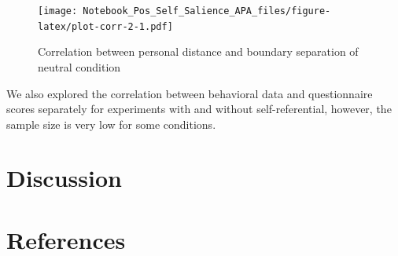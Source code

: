 \documentclass[
  english,
  man]{apa6}
\begin{document}
\begin{figure}
\centering
\texttt{[image: Notebook\_Pos\_Self\_Salience\_APA\_files/figure-latex/plot-corr-2-1.pdf]}
\caption{\label{fig:plot-corr-2}Correlation between personal distance and boundary separation of neutral condition}
\end{figure}

We also explored the correlation between behavioral data and questionnaire scores separately for experiments with and without self-referential, however, the sample size is very low for some conditions.

\hypertarget{discussion-2}{%
\section{Discussion}\label{discussion-2}}

\hypertarget{references}{%
\section{References}\label{references}}

\begingroup
\setlength{\parindent}{-0.5in}
\setlength{\leftskip}{0.5in}
\end{document}
